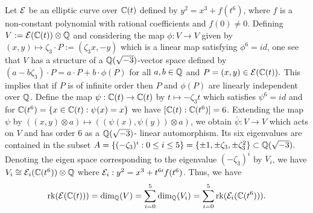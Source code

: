\documentclass[11pt]{amsart}
\begin{document}
Let ${\mathcal E}$ be an elliptic curve over ${\mathbb C}(t)$ defined by 
$y^2=x^3+ f(t^6)$, where $f$ is a non-constant polynomial  with rational coefficients and $f(0)\neq 0$. Defining
$V:={\mathcal E}({\mathbb C}(t)) \otimes {\mathbb Q}$  and  considering the map
$\phi: V \rightarrow V$ given by 
$(x, y) \mapsto \zeta_3 \cdot P := (\zeta_3 x, - y)$
which	is a linear map satisfying $\phi^6=id$,  one see that $V$ has a structure of  a ${\mathbb Q}(\sqrt{-3})$-vector space defined by
$(a-b  \zeta_3)\cdot P= a \cdot P + b \cdot \phi(P)$ for all $a, b \in {\mathbb Q}$ and $P=(x,y) \in {\mathcal E}({\mathbb C}(t)).$ This implies that if $P$ is of infinite order then
$P$ and $\phi(P) $ are linearly independent over ${\mathbb Q}$. 
Define the map $\psi: {\mathbb C}(t) \rightarrow {\mathbb C}(t)$ by $t\mapsto - \zeta_3  t$ which satisfies $\psi^6=id$ and for ${\mathbb C}(t^6)=\{ x\in {\mathbb C}(t): \psi(x)=x\}$  we have 
$[{\mathbb C}(t): {\mathbb C}(t^6)]=6$. Extending the map $\psi$ by 
$((x, y)\otimes a) \mapsto ((\psi(x), \psi(y))\otimes a)$,
we obtain 
$\bar{\psi}: V \rightarrow V$   which acts on $V$ and 
has order $6$  as a ${\mathbb Q}(\sqrt{-3})$- linear automorphism.
Its six eigenvalues are contained in the subset
$A=\{(-\zeta_3)^i:   0 \leq i \leq 5\}=\{\pm 1, \pm \zeta_3, \pm \zeta_3^2 \} \subset {\mathbb Q}(\sqrt{-3}).$
Denoting  the eigen space corresponding to the eigenvalue $(-\zeta_3)^i$ by $V_i$, we have
$V_i \cong {\mathcal E}_i({\mathbb C}(t^6))\otimes {\mathbb Q} $ where $ {\mathcal E}_i: y^2=x^3+ t^{6 i} f(t^6)$.
Thus, we have 
$${\text{rk}} ({\mathcal E}({\mathbb C}(t))) =\dim_{\mathbb Q}(V)=\sum_{i=0}^{5} \dim_{\mathbb Q}(V_i)=
\sum_{i=0}^5 {\text{rk}} ({\mathcal E}_i({\mathbb C}(t^6))).$$
\end{document}
